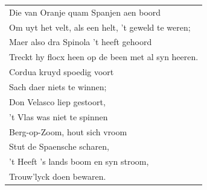 \documentclass[a4paper, 14pt]{extarticle}
\begin{document}
\begin{flushleft}
\begin{tabularx}{0.8\textwidth} {
   >{\raggedright\arraybackslash}X}
   Die van Oranje quam Spanjen aen boord\\
Om uyt het velt, als een helt, ’t geweld te weren;\\
Maer also dra Spinola ’t heeft gehoord\\
Treckt hy flocx heen op de been met al syn heeren.\\
Cordua kruyd spoedig voort\\
Sach daer niets te winnen;\\
Don Velasco liep gestoort,\\
’t Vlas was niet te spinnen\\
Berg-op-Zoom, hout sich vroom\\
Stut de Spaensche scharen,\\
’t Heeft ’s lands boom en syn stroom,\\
Trouw’lyck doen bewaren.\\
\end{tabularx}
\end{flushleft}
\end{document}
